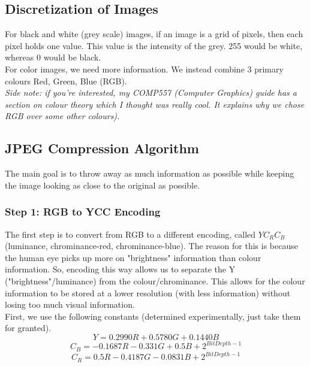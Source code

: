\documentclass[12pt]{article}
\theoremstyle{definition}
\begin{document}
\subsection{Discretization of Images}
For black and white (grey scale) images, if an image is a grid of pixels, then each pixel holds one value. This value is the intensity of the grey. 255 would be white, whereas 0 would be black. 
\\ \linebreak
For color images, we need more information. We instead combine 3 primary colours Red, Green, Blue (RGB). 
\\ \linebreak
\textit{Side note: if you're interested, my COMP557 (Computer Graphics) guide has a section on colour theory which I thought was really cool. It explains why we chose RGB over some other colours).}
\\ \linebreak

\subsection{JPEG Compression Algorithm}
The main goal is to throw away as much information as possible while keeping the image looking as close to the original as possible.
\\ \linebreak
\subsubsection{Step 1: RGB to YCC Encoding}
The first step is to convert from RGB to a different encoding, called $YC_RC_B$ (luminance, chrominance-red, chrominance-blue). The reason for this is because the human eye picks up more on "brightness" information than colour information. So, encoding this way allows us to separate the Y ("brightness"/luminance) from the colour/chrominance. This allows for the colour information to be stored at a lower resolution (with less information) without losing too much visual information.
\\ \linebreak
First, we use the following constants (determined experimentally, just take them for granted). 
$$Y = 0.2990R + 0.5780G + 0.1440B$$
$$ C_B = -0.1687R - 0.331G + 0.5B + 2^{BitDepth-1}$$
$$ C_R = 0.5R - 0.4187G - 0.0831B + 2^{BitDepth-1}$$
\end{document}
